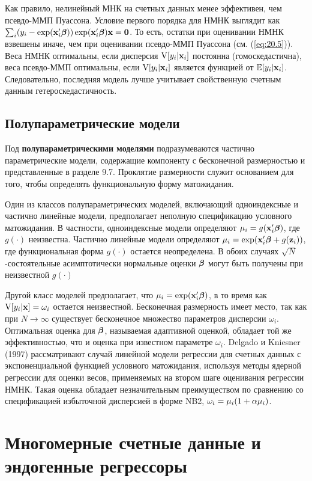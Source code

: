 Как правило, нелинейный МНК на счетных данных менее эффективен, чем псевдо-ММП Пуассона. Условие первого порядка для НМНК выглядит как $\sum_i (y_i - \exp(\mathbf{x}_i'\bm{\beta}))\exp(\mathbf{x}_i'\bm{\beta})\mathbf{x} = \mathbf{0}$. То есть, остатки при оценивании НМНК взвешены иначе, чем при оценивании псевдо-ММП Пуассона (см. (\ref{eq:20.5})). Веса НМНК оптимальны, если дисперсия $\mathrm{V}[y_i|\mathbf{x}_i]$ постоянна (гомоскедастична), веса псевдо-ММП оптимальны, если $\mathrm{V}[y_i|\mathbf{x}_i]$ является функцией от $\mathbb{E}[y_i|\mathbf{x}_i]$. Следовательно, последняя модель лучше учитывает свойственную счетным данным гетероскедастичность.


\subsection{Полупараметрические модели}\label{sec:20.5.3}

\noindent
Под \textbf{полупараметрическими моделями} подразумеваются частично параметрические модели, содержащие компоненту с бесконечной размерностью и представленные в разделе 9.7. Проклятие размерности служит основанием для того, чтобы определять функциональную форму матожидания.

Один из классов полупараметрических моделей, включающий одноиндексные и частично линейные модели, предполагает неполную спецификацию условного матожидания. В частности, одноиндексные модели определяют $\mu_i = g(\mathbf{x}_i'\bm{\beta})$, где $g(\cdot)$ неизвестна. Частично линейные модели определяют $\mu_i = \exp(\mathbf{x}_i'\bm{\beta} + g(\mathbf{z}_i))$, где функциональная форма $g(\cdot)$ остается неопределена. В обоих случаях $\sqrt{N}$-состоятельные асимптотически нормальные оценки $\bm{\beta}$ могут быть получены при неизвестной $g(\cdot)$

Другой класс моделей предполагает, что $\mu_i = \exp(\mathbf{x}_i'\bm{\beta})$, в то время как $\mathrm{V}[y_i|\mathbf{x}] = \omega_i$ остается неизвестной. Бесконечная размерность имеет место, так как при $N \rightarrow \infty$ существует бесконечное множество параметров дисперсии $\omega_i$. Оптимальная оценка для $\bm{\beta}$, называемая адаптивной оценкой, обладает той же эффективностью, что и оценка при известном параметре $\omega_i$. Delgado и Kniesner (1997) рассматривают случай линейной модели регрессии для счетных данных с экспоненциальной функцией условного матожидания, используя методы ядерной регрессии для оценки весов, применяемых на втором шаге оценивания регрессии НМНК. Такая оценка обладает незначительным преимуществом по сравнению со спецификацией избыточной дисперсией в форме NB2, $\omega_i = \mu_i (1 + \alpha\mu_i)$.


\section{Многомерные счетные данные и эндогенные регрессоры}\label{sec:20.6}

